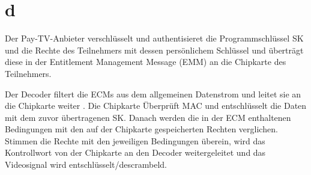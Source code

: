 \documentclass[12pt.twoside,a4paper,notitlepage]{article}
\begin{document}
\section*{d}
Der Pay-TV-Anbieter verschlüsselt und authentisieret die Programmschlüssel SK und die Rechte des Teilnehmers mit dessen persönlichem Schlüssel  und überträgt diese in der Entitlement Management Message (EMM) an die Chipkarte des Teilnehmers.

Der Decoder filtert die ECMs aus dem allgemeinen Datenstrom  und leitet sie an die Chipkarte weiter . Die Chipkarte Überprüft MAC  und entschlüsselt die Daten mit dem zuvor übertragenen SK. Danach werden die in der ECM enthaltenen Bedingungen mit den auf der Chipkarte gespeicherten Rechten verglichen. Stimmen  die Rechte mit den jeweiligen Bedingungen überein, wird das Kontrollwort von der Chipkarte an den Decoder weitergeleitet und das Videosignal wird entschlüsselt/descrambeld.
\end{document}
